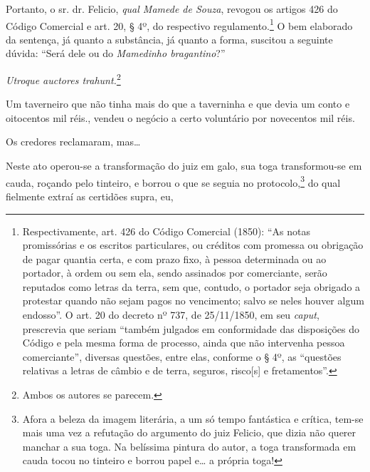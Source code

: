 Portanto, o sr. dr. Felicio, \emph{qual Mamede de Souza}, revogou os
artigos 426 do Código Comercial e art. 20, § 4º, do respectivo
regulamento.\footnote{ Respectivamente, art. 426 do Código Comercial
  (1850): ``As notas promissórias e os escritos particulares, ou créditos
  com promessa ou obrigação de pagar quantia certa, e com prazo fixo, à
  pessoa determinada ou ao portador, à ordem ou sem ela, sendo assinados
  por comerciante, serão reputados como letras da terra, sem que,
  contudo, o portador seja obrigado a protestar quando não sejam pagos
  no vencimento; salvo se neles houver algum endosso''. O art. 20 do
  decreto nº 737, de 25/11/1850, em seu \emph{caput}, prescrevia que
  seriam ``também julgados em conformidade das dis­posições do Código e
  pela mesma forma de processo, ainda que não intervenha pessoa
  comerciante'', diversas questões, entre elas, conforme o § 4º, as
  ``questões relativas a letras de câmbio e de terra, seguros,
  risco{[}s{]} e fretamentos''.} O bem elaborado da sentença, já quanto a
substância, já quanto a forma, suscitou a seguinte dúvida: ``Será dele ou
do \emph{Mamedinho bragantino}?''

\emph{Utroque auctores trahunt.}\footnote{ Ambos os autores se parecem.}

\asterisc{}

Um taverneiro que não tinha mais do que a taverninha e que devia um
conto e oitocentos mil réis., vendeu o negócio a certo voluntário por
novecentos mil réis.

Os credores reclamaram, mas\ldots{}

Neste ato operou-se a transformação do juiz em galo, sua toga
transformou-se em cauda, roçando pelo tinteiro, e borrou o que se seguia
no protocolo,\footnote{ Afora a beleza da imagem literária, a um só
  tempo fantástica e crítica, tem-se mais uma vez a refutação do
  argumento do juiz Felicio, que dizia não querer manchar a sua toga. Na
  belíssima pintura do autor, a toga transformada em cauda tocou no
  tinteiro e borrou papel e\ldots{} a própria toga!} do qual fielmente extraí
as certidões supra, eu,

